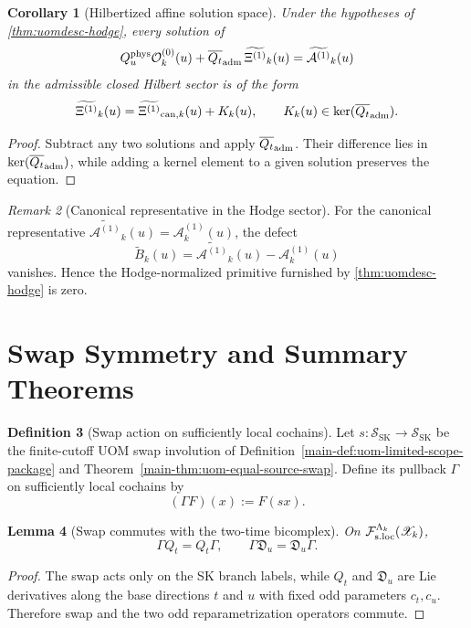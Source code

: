 \documentclass[11pt]{article}
\theoremstyle{definition}
\newtheorem{definition}{Definition}[section]
\theoremstyle{plain}
\newtheorem{lemma}[definition]{Lemma}
\newtheorem{corollary}[definition]{Corollary}
\theoremstyle{remark}
\newtheorem{remark}[definition]{Remark}
\newcommand{\Fsloc}{\mathcal F_{\rm s.loc}}
\newcommand{\Xscr}{\mathscr X}
\newcommand{\Ozero}{\mathcal O^{(0)}}
\newcommand{\Aone}{\mathcal A^{(1)}}
\newcommand{\Xione}{\Xi^{(1)}}
\newcommand{\Qt}{Q_t}
\newcommand{\Du}{\mathfrak D_u}
\newcommand{\Quphys}{Q_u^{\rm phys}}
\newcommand{\SK}{\mathrm{SK}}
\begin{document}
\begin{corollary}[Hilbertized affine solution space]
\label{cor:uomdesc-hodge-torsor}
Under the hypotheses of \cref{thm:uomdesc-hodge}, every solution of
\[
\Quphys\Ozero_k(u)+\overline{\Qt}_{\rm adm}\,\widetilde{\Xione}_k(u)=\widetilde{\Aone}_k(u)
\]
in the admissible closed Hilbert sector is of the form
\[
\widetilde{\Xione}_k(u)
=
\widetilde{\Xione}_{{\rm can},k}(u)+K_k(u),
\qquad
K_k(u)\in\ker(\overline{\Qt}_{\rm adm}).
\]
\end{corollary}

\begin{proof}
Subtract any two solutions and apply \(\overline{\Qt}_{\rm adm}\).
Their difference lies in \(\ker(\overline{\Qt}_{\rm adm})\), while adding a kernel element to a
given solution preserves the equation.
\end{proof}

\begin{remark}[Canonical representative in the Hodge sector]
\label{rem:uomdesc-second-closure}
For the canonical representative \(\widetilde{\Aone}_k(u)=\Aone_k(u)\), the defect
\[
\widetilde{B}_k(u)=\widetilde{\Aone}_k(u)-\Aone_k(u)
\]
vanishes.
Hence the Hodge-normalized primitive furnished by \cref{thm:uomdesc-hodge} is zero.
\end{remark}

\section{Swap Symmetry and Summary Theorems}
\label{sec:uomdesc-package}

\begin{definition}[Swap action on sufficiently local cochains]
\label{def:uomdesc-gamma}
Let \(s:\mathcal S_{\SK}\to\mathcal S_{\SK}\) be the finite-cutoff UOM swap involution of
Definition~\ref{main-def:uom-limited-scope-package} and
Theorem~\ref{main-thm:uom-equal-source-swap}.
Define its pullback \(\Gamma\) on sufficiently local cochains by
\[
(\Gamma F)(x):=F(sx).
\]
\end{definition}

\begin{lemma}[Swap commutes with the two-time bicomplex]
\label{lem:uomdesc-gamma-comm}
On \(\Fsloc^{\Lambda_k}(\Xscr_k)\),
\[
\Gamma\Qt=\Qt\Gamma,
\qquad
\Gamma\Du=\Du\Gamma.
\]
\end{lemma}

\begin{proof}
The swap acts only on the SK branch labels, while \(\Qt\) and \(\Du\) are Lie derivatives along the
base directions \(t\) and \(u\) with fixed odd parameters \(c_t,c_u\).
Therefore swap and the two odd reparametrization operators commute.
\end{proof}
\end{document}
